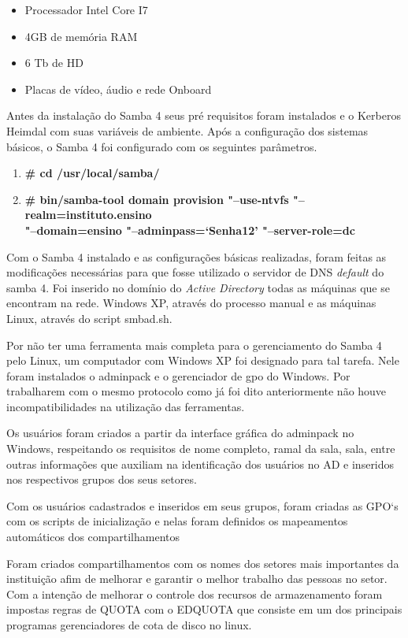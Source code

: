 \begin{itemize}
	\item{Processador Intel Core I7\textregistered}
	\item{4GB de memória RAM}
	\item{6 Tb de HD}
	\item{Placas de vídeo, áudio e rede Onboard}
\end{itemize}

Antes da instalação do Samba 4 seus pré requisitos foram instalados e o Kerberos Heimdal com suas variáveis de ambiente.
Após a configuração dos sistemas básicos, o Samba 4 foi configurado com os seguintes parâmetros.

\begin{enumerate}
	\item \textbf{\# cd /usr/local/samba/}
	\item \textbf{\# bin/samba-tool domain provision "--use-ntvfs "--realm=instituto.ensino\\"--domain=ensino  "--adminpass=`Senha12' "--server-role=dc}
\end{enumerate}

Com o Samba 4 instalado e as configurações básicas realizadas, foram feitas as modificações necessárias para que fosse utilizado o servidor de DNS \textit{default} do samba 4. Foi inserido no domínio do \textit{Active Directory} todas as máquinas que se encontram na rede. Windows XP, através do processo manual e as máquinas Linux, através do script smbad.sh.

Por não ter uma ferramenta mais completa para o gerenciamento do Samba 4 pelo Linux, um computador com Windows XP foi designado para tal tarefa. Nele foram instalados o adminpack e o gerenciador de gpo do Windows. Por trabalharem com o mesmo protocolo como já foi dito anteriormente não houve incompatibilidades na utilização das ferramentas.

Os usuários foram criados a partir da interface gráfica do adminpack no Windows, respeitando os requisitos de nome completo, ramal da sala, sala, entre outras informações que auxiliam na identificação dos usuários no AD e inseridos nos respectivos grupos dos seus setores.

Com os usuários cadastrados e inseridos em seus grupos, foram criadas as GPO`s com os scripts de inicialização e nelas foram definidos os mapeamentos automáticos dos compartilhamentos

Foram criados compartilhamentos com os nomes dos setores mais importantes da instituição afim de melhorar e garantir o melhor trabalho das pessoas no setor. Com a intenção de melhorar o controle dos recursos de armazenamento foram impostas regras de QUOTA com o EDQUOTA que consiste em um dos principais programas gerenciadores de cota de disco no linux.

